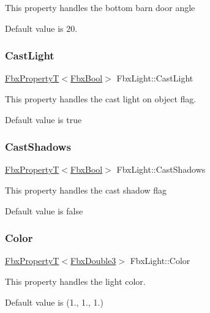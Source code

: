 This property handles the bottom barn door angle

Default value is 20. \mbox{\label{class_fbx_light_aab7e8386257e02ef8e3873f15d5fc690}} 
\subsubsection{\texorpdfstring{Cast\+Light}{CastLight}}
{\footnotesize\ttfamily \hyperlink{class_fbx_property_t}{Fbx\+PropertyT}$<$\hyperlink{fbxtypes_8h_a92e0562b2fe33e76a242f498b362262e}{Fbx\+Bool}$>$ Fbx\+Light\+::\+Cast\+Light}

This property handles the cast light on object flag.

Default value is true \mbox{\label{class_fbx_light_a9ab7648e8c96d34f4feb5c76c52987ce}} 
\subsubsection{\texorpdfstring{Cast\+Shadows}{CastShadows}}
{\footnotesize\ttfamily \hyperlink{class_fbx_property_t}{Fbx\+PropertyT}$<$\hyperlink{fbxtypes_8h_a92e0562b2fe33e76a242f498b362262e}{Fbx\+Bool}$>$ Fbx\+Light\+::\+Cast\+Shadows}

This property handles the cast shadow flag

Default value is false \mbox{\label{class_fbx_light_abd8989416ecbe6a33adcb6bc09b2401b}} 
\subsubsection{\texorpdfstring{Color}{Color}}
{\footnotesize\ttfamily \hyperlink{class_fbx_property_t}{Fbx\+PropertyT}$<$\hyperlink{fbxtypes_8h_ae0a96f14cde566774c7553aa7523b7a7}{Fbx\+Double3}$>$ Fbx\+Light\+::\+Color}

This property handles the light color.

Default value is (1., 1., 1.) \mbox{\label{class_fbx_light_a33459f3a22c886508580c8879ee6cb54}} 
